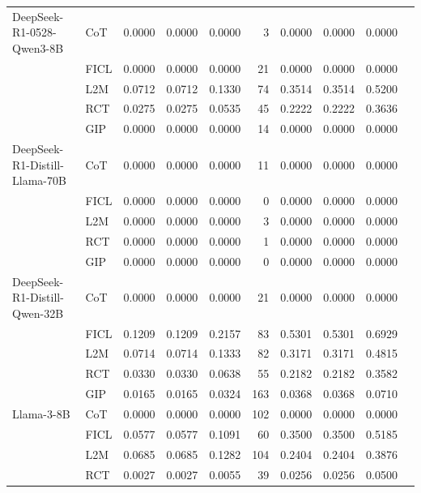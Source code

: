 \documentclass[conference]{IEEEtran}
\begin{document}
\begin{longtable}{p{3.5cm} l r r r r r r r r}
DeepSeek-R1-0528-Qwen3-8B & CoT  & 0.0000 & 0.0000 & 0.0000 & 3   & 0.0000 & 0.0000 & 0.0000 \\
                          & FICL & 0.0000 & 0.0000 & 0.0000 & 21  & 0.0000 & 0.0000 & 0.0000 \\
                          & L2M  & 0.0712 & 0.0712 & 0.1330 & 74  & 0.3514 & 0.3514 & 0.5200 \\
                          & RCT  & 0.0275 & 0.0275 & 0.0535 & 45  & 0.2222 & 0.2222 & 0.3636 \\
                          & GIP  & 0.0000 & 0.0000 & 0.0000 & 14  & 0.0000 & 0.0000 & 0.0000 \\
DeepSeek-R1-Distill-Llama-70B & CoT  & 0.0000 & 0.0000 & 0.0000 & 11  & 0.0000 & 0.0000 & 0.0000 \\
                             & FICL & 0.0000 & 0.0000 & 0.0000 & 0   & 0.0000 & 0.0000 & 0.0000 \\
                             & L2M  & 0.0000 & 0.0000 & 0.0000 & 3   & 0.0000 & 0.0000 & 0.0000 \\
                             & RCT  & 0.0000 & 0.0000 & 0.0000 & 1   & 0.0000 & 0.0000 & 0.0000 \\
                             & GIP  & 0.0000 & 0.0000 & 0.0000 & 0   & 0.0000 & 0.0000 & 0.0000 \\
DeepSeek-R1-Distill-Qwen-32B & CoT  & 0.0000 & 0.0000 & 0.0000 & 21  & 0.0000 & 0.0000 & 0.0000 \\
                            & FICL & 0.1209 & 0.1209 & 0.2157 & 83  & 0.5301 & 0.5301 & 0.6929 \\
                            & L2M  & 0.0714 & 0.0714 & 0.1333 & 82  & 0.3171 & 0.3171 & 0.4815 \\
                            & RCT  & 0.0330 & 0.0330 & 0.0638 & 55  & 0.2182 & 0.2182 & 0.3582 \\
                            & GIP  & 0.0165 & 0.0165 & 0.0324 & 163 & 0.0368 & 0.0368 & 0.0710 \\
Llama-3-8B                  & CoT  & 0.0000 & 0.0000 & 0.0000 & 102 & 0.0000 & 0.0000 & 0.0000 \\
                            & FICL & 0.0577 & 0.0577 & 0.1091 & 60  & 0.3500 & 0.3500 & 0.5185 \\
                            & L2M  & 0.0685 & 0.0685 & 0.1282 & 104 & 0.2404 & 0.2404 & 0.3876 \\
                            & RCT  & 0.0027 & 0.0027 & 0.0055 & 39  & 0.0256 & 0.0256 & 0.0500 \\

\end{longtable}
\end{document}
